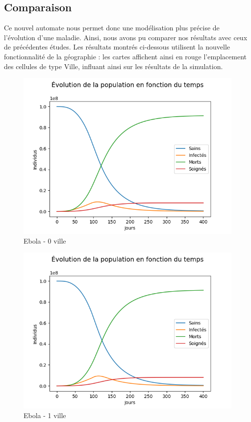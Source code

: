 \documentclass{article}
\begin{document}
 \subsection{Comparaison}
Ce nouvel automate nous permet donc une modélisation plus précise de l'évolution d'une maladie. Ainsi, nous avons pu comparer nos résultats avec ceux de précédentes études.
Les résultats montrés ci-dessous utilisent la nouvelle fonctionnalité de la géographie : les cartes affichent ainsi en rouge l'emplacement des cellules de type Ville, influant ainsi sur les résultats de la simulation.
\begin{figure}[H]
\caption{Ebola - 0 ville}
\centering
\includegraphics[scale=0.8]{../images/automate2_ebola_0villes.png}
\end{figure}

\begin{figure}[H]
\caption{Ebola - 1 ville}
\centering
\includegraphics[scale=0.8]{../images/automarte2_ebola_1ville_proba2.png}
\end{figure}
\end{document}
